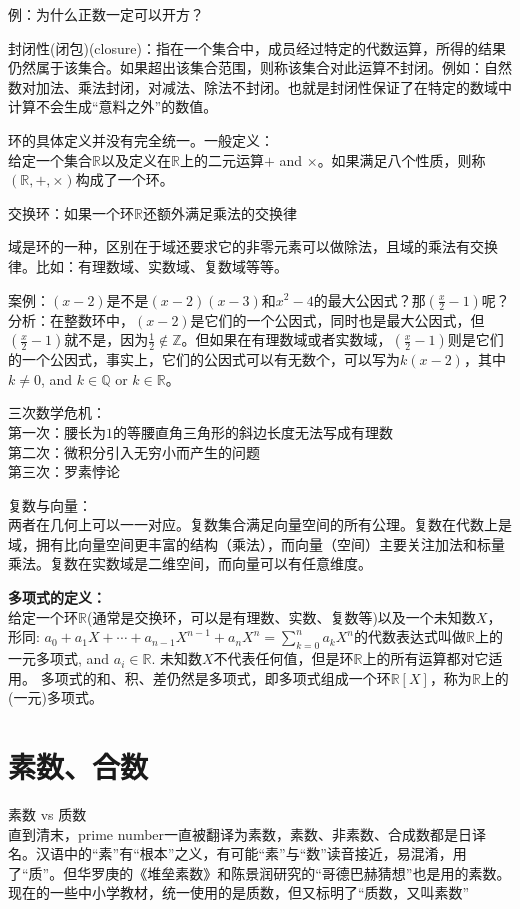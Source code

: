\documentclass[../main.tex]{subfiles}
\begin{document}
例：为什么正数一定可以开方？

封闭性(闭包)(closure)：指在一个集合中，成员经过特定的代数运算，所得的结果仍然属于该集合。如果超出该集合范围，则称该集合对此运算不封闭。例如：自然数对加法、乘法封闭，对减法、除法不封闭。也就是封闭性保证了在特定的数域中计算不会生成“意料之外”的数值。

环的具体定义并没有完全统一。一般定义：\\
给定一个集合$\mathbb{R}$以及定义在$\mathbb{R}$上的二元运算$+$ and $\times$。如果满足八个性质，则称$(\mathbb{R}, +, \times)$构成了一个环。

交换环：如果一个环$\mathbb{R}$还额外满足乘法的交换律

域是环的一种，区别在于域还要求它的非零元素可以做除法，且域的乘法有交换律。比如：有理数域、实数域、复数域等等。

案例：$(x-2)$是不是$(x-2)(x-3)$和$x^2-4$的最大公因式？那$(\frac{x}{2} -1)$呢？\\
分析：在整数环中，$(x-2)$是它们的一个公因式，同时也是最大公因式，但$(\frac{x}{2}-1)$就不是，因为$\frac{1}{2}\notin \mathbb{Z}$。但如果在有理数域或者实数域，$(\frac{x}{2}-1)$则是它们的一个公因式，事实上，它们的公因式可以有无数个，可以写为$k(x-2)$，其中$k\neq 0$, and $k\in \mathbb{Q}$ or $k\in \mathbb{R}$。

三次数学危机：\\
第一次：腰长为$1$的等腰直角三角形的斜边长度无法写成有理数\\
第二次：微积分引入无穷小而产生的问题\\
第三次：罗素悖论

复数与向量：\\
两者在几何上可以一一对应。复数集合满足向量空间的所有公理。复数在代数上是域，拥有比向量空间更丰富的结构（乘法），而向量（空间）主要关注加法和标量乘法。复数在实数域是二维空间，而向量可以有任意维度。

\textbf{多项式的定义：}\\
给定一个环$\mathbb{R}$(通常是交换环，可以是有理数、实数、复数等)以及一个未知数$X$，形同:
$a_0+a_1X+\cdots +a_{n-1}X^{n-1}+a_nX^n = \sum_{k=0}^na_kX^n$的代数表达式叫做$\mathbb{R}$上的一元多项式, and $ a_i\in \mathbb{R}$. 未知数$X$不代表任何值，但是环$\mathbb{R}$上的所有运算都对它适用。
多项式的和、积、差仍然是多项式，即多项式组成一个环$\mathbb{R}[X]$，称为$\mathbb{R}$上的(一元)多项式。

\newpage
\section{素数、合数}
素数 vs 质数\\
直到清末，prime number一直被翻译为素数，素数、非素数、合成数都是日译名。汉语中的“素”有“根本”之义，有可能“素”与“数”读音接近，易混淆，用了“质”。但华罗庚的《堆垒素数》和陈景润研究的“哥德巴赫猜想”也是用的素数。现在的一些中小学教材，统一使用的是质数，但又标明了“质数，又叫素数”
\end{document}
